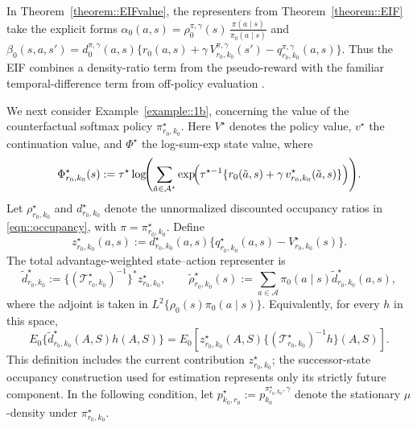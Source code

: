 \documentclass[12pt]{article}
\theoremstyle{plain}
\begin{document}
\noindent In Theorem~\ref{theorem::EIFvalue}, the representers from 
Theorem~\ref{theorem::EIF} take the explicit forms
$\alpha_0(a,s) = \rho_0^{\pi,\gamma}(s)\,\tfrac{\pi(a\mid s)}{\pi_0(a\mid s)}$
and 
$\beta_0(s,a,s')
= d_0^{\pi,\gamma}(a,s)\{r_0(a,s) + \gamma\,V_{r_0,k_0}^{\pi,\gamma}(s') 
- q_{r_0,k_0}^{\pi,\gamma}(a,s)\}$.  
Thus the EIF combines a density-ratio term from the pseudo-reward with the
familiar temporal-difference term from off-policy evaluation
\citep{van2018online, kallus2020double, kallus2022efficiently, van2025automaticDRL}.  


 
We next consider Example~\ref{example::1b}, concerning the value of the
counterfactual softmax policy \(\pi_{r_0,k_0}^\star\). Here \(V^\star\)
denotes the policy value, \(v^\star\) the continuation value, and
\(\Phi^\star\) the log-sum-exp state value, where
\[
\Phi_{r_0,k_0}^\star(s)
:= \tau^\star \log\!\Biggl(\sum_{\tilde a \in \mathcal{A}^\star}
\exp\!\Bigl(\tau^{\star-1}\{r_0(\tilde a,s)
+ \gamma\,v_{r_0,k_0}^\star(\tilde a,s)\}\Bigr)\Biggr).
\]
Let \(\rho_{r_0,k_0}^\star\) and \(d_{r_0,k_0}^\star\) denote the
unnormalized discounted occupancy ratios in \eqref{eqn::occupancy}, with
\(\pi=\pi_{r_0,k_0}^\star\). Define
\[
z_{r_0,k_0}^\star(a,s)
:=d_{r_0,k_0}^\star(a,s)
\{q_{r_0,k_0}^\star(a,s)-V_{r_0,k_0}^\star(s)\}.
\]
The total advantage-weighted state--action representer is
\begin{equation}
\label{eqn::tilderho}
\widetilde d_{r_0,k_0}^\star
:=\big\{(\mathcal T_{r_0,k_0}^\star)^{-1}\big\}^{*}
z_{r_0,k_0}^\star,
\qquad
\widetilde\rho_{r_0,k_0}^\star(s)
:=\sum_{a\in\mathcal A}\pi_0(a\mid s)
\widetilde d_{r_0,k_0}^\star(a,s),
\end{equation}
where the adjoint is taken in
\(L^2\{\rho_0(s)\pi_0(a\mid s)\}\). Equivalently, for every
\(h\) in this space,
\[
E_0\{\widetilde d_{r_0,k_0}^\star(A,S)h(A,S)\}
=E_0\!\left[z_{r_0,k_0}^\star(A,S)
\{(\mathcal T_{r_0,k_0}^\star)^{-1}h\}(A,S)\right].
\]
This definition includes the current contribution
\(z_{r_0,k_0}^\star\); the successor-state occupancy construction used for
estimation represents only its strictly future component.
In the following condition, let
$p_{k_0, r_0}^{\star} := p_{k_0}^{\pi_{r_0, k_0}^\star, \gamma}$ denote the
stationary $\mu$-density under $\pi_{r_0, k_0}^\star$.
\end{document}
